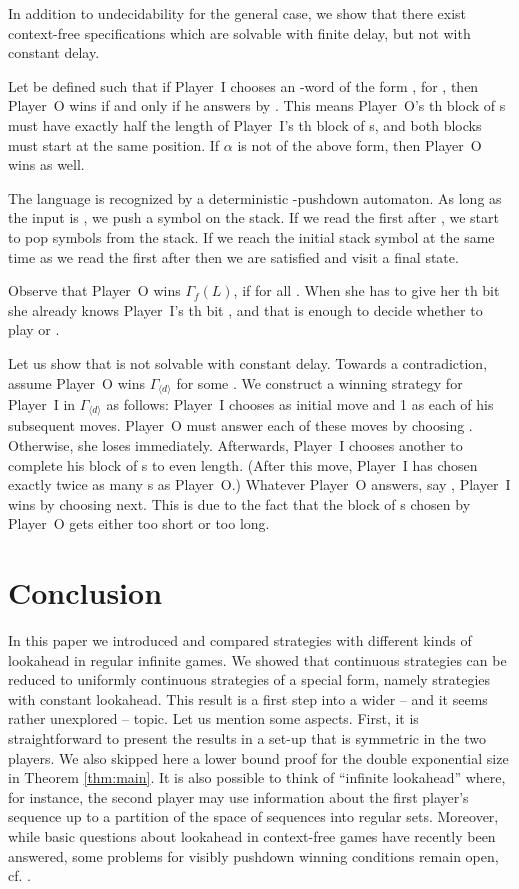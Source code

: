 \documentclass[fleqn,envcountsame]{LMCS}
\newcommand{\pI}{Player~I\xspace}
\newcommand{\pO}{Player~O\xspace}
\newcommand{\Gd}[1]{\ensuremath{\Gamma_{#1}}\xspace}
\newcommand{\GdL}[1]{\ensuremath{\Gamma_{#1}(L)}\xspace}
\newcommand{\const}[1]{\ensuremath{\langle#1\rangle}\xspace}
\newcommand{\al}{\ensuremath{\alpha}\xspace}
\begin{document}
In addition to undecidability for the general case, we show that there exist
context-free specifications which are solvable with finite delay,
but not with constant delay.

\begin{exa}\label{ex:non_regular_not_constant_delay}
Let  be defined such that if \pI chooses an -word
of the form , for , then
\pO wins if and only if he answers by .
This means \pO's th block of s must have exactly half the length of
\pI's th block of s, and both blocks must start at the same position.
If \al is not of the above form, then \pO wins as well.

The language  is recognized by a deterministic -pushdown automaton.
As long as the input is , we push a symbol on the stack.
If we read the first  after ,
we start to pop symbols from the stack. If we reach the initial stack
symbol at the same time as we read the first 
after  then we are satisfied and visit a final state.

Observe that \pO wins \GdL{f}, if  for all .
When she has to give her th bit  she already knows \pI's th bit ,
and that is enough to decide whether to play  or .

Let us show that  is not solvable with constant delay.
Towards a contradiction, assume \pO wins \Gd{\const{d}} for some .
We construct a winning strategy for \pI in \Gd{\const{d}} as follows:
\pI chooses  as initial move and 1 as each of his  subsequent moves.
\pO must answer each of these  moves by choosing . Otherwise, she loses immediately.
Afterwards, \pI chooses another  to complete his block of s to even length.
(After this move, \pI has chosen exactly twice as many s as \pO.)
Whatever \pO answers, say , \pI wins by choosing  next.
This is due to the fact that the block of s chosen by \pO gets either
too short or too long. 
\end{exa}



\section{Conclusion}\label{sec:conclusion}

In this paper we introduced and compared strategies
with different kinds of lookahead in regular infinite games.
We showed that continuous strategies can be reduced to
uniformly continuous strategies of a special form,
namely strategies with constant lookahead.
This result is a first step into a wider -- and it
seems rather unexplored -- topic. Let us mention some
aspects. First, it is straightforward to present
the results in a set-up that is symmetric in the two players.
We also skipped here a lower bound proof for the
double exponential size in Theorem \ref{thm:main}.
It is also possible to think of ``infinite lookahead'' where,
for instance, the second player may use information about
the first player's sequence up to a partition of the
space of sequences into regular sets. Moreover, while
basic questions about lookahead in context-free games have
recently been answered, some problems for visibly pushdown
winning conditions remain open, cf. \cite{FLZ11}.
\end{document}
